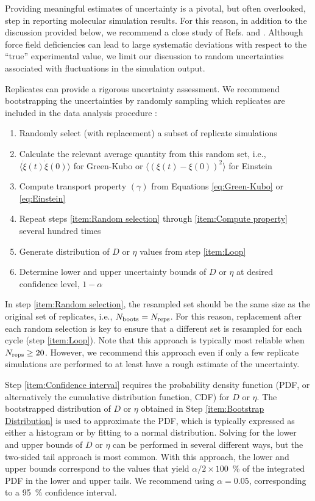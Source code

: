 \documentclass[9pt,bestpractices]{livecoms}
\begin{document}
Providing meaningful estimates of uncertainty is a pivotal, but often overlooked, step in reporting molecular simulation results. For this reason, in addition to the discussion provided below, we recommend a close study of Refs. \cite{GUM} and \cite{Grossfield2018}. Although force field deficiencies can lead to large systematic deviations with respect to the ``true'' experimental value, we limit our discussion to random uncertainties associated with fluctuations in the simulation output.

Replicates can provide a rigorous uncertainty assessment. We recommend bootstrapping the uncertainties by randomly sampling which replicates are included in the data analysis procedure \cite{Efron1979}:

\begin{enumerate}
	\item Randomly select (with replacement) a subset of replicate simulations \label{item:Random selection}
	\item Calculate the relevant average quantity from this random set, i.e., $\langle\dot{\xi}(t)\dot{\xi}(0)\rangle$ for Green-Kubo or $\langle (\xi(t)-\xi(0))^2 \rangle$ for Einstein
	\item Compute transport property $(\gamma)$ from Equations \ref{eq:Green-Kubo} or \ref{eq:Einstein} \label{item:Compute property}
	\item Repeat steps \ref{item:Random selection} through \ref{item:Compute property} several hundred times \label{item:Loop}
	\item Generate distribution of $D$ or $\eta$ values from step \ref{item:Loop} \label{item:Bootstrap Distribution}
	\item Determine lower and upper uncertainty bounds of $D$ or $\eta$ at desired confidence level, $1-\alpha$ \label{item:Confidence interval}
\end{enumerate}
In step \ref{item:Random selection}, the resampled set should be the same size as the original set of replicates, i.e., $N_{\rm boots} = N_{\rm reps}$. For this reason, replacement after each random selection is key to ensure that a different set is resampled for each cycle (step \ref{item:Loop}). Note that this approach is typically most reliable when $N_{\rm reps} \ge 20$. However, we recommend this approach even if only a few replicate simulations are performed to at least have a rough estimate of the uncertainty.
 
Step \ref{item:Confidence interval} requires the probability density function (PDF, or alternatively the cumulative distribution function, CDF) for $D$ or $\eta$. The bootstrapped distribution of $D$ or $\eta$ obtained in Step \ref{item:Bootstrap Distribution} is used to approximate the PDF, which is typically expressed as either a histogram or by fitting to a normal distribution. Solving for the lower and upper bounds of $D$ or $\eta$ can be performed in several different ways, but the two-sided tail approach is most common. With this approach, the lower and upper bounds correspond to the values that yield $\alpha/2 \times 100$~\% of the integrated PDF in the lower and upper tails. We recommend using $\alpha = 0.05$, corresponding to a 95~\% confidence interval.
\end{document}
